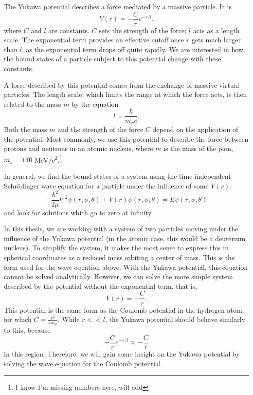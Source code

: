 \documentclass[12pt,twoside]{reedthesis}
\newcommand{\eqn}[1]{\begin{equation}#1\end{equation}}
\begin{document}
The Yukawa potential describes a force mediated by a massive particle. It is %
\eqn{
V(r) = -\frac{C}{r}e^{-r/l}\mbox{,}
}
where $C$ and $l$ are constants. $C$ sets the strength of the force; $l$ acts as a length scale. The exponential term provides an effective cutoff once $r$ gets much larger than $l$, as the exponential term drops off quite rapidly. We are interested in how the bound states of a particle subject to this potential change with these constants. 

A force described by this potential comes from the exchange of massive virtual particles. The length scale, which limits the range at which the force acts, is then related to the mass $m$ by the equation\eqn{
l = \frac{\hbar}{m_{\pi}c}\mbox{.}
}
Both the mass $m$ and the strength of the force $C$ depend on the application of the potential. Most commonly, we use this potential to describe the force between protons and neutrons in an atomic nucleus, where $m$ is the mass of the pion, $m_{\pi} = 140$ MeV/c$^2$.\footnote{I know I'm missing numbers here, will add}

In general, we find the bound states of a system using the time-independent Schr\"odinger wave equation for a particle under the influence of some $V(r)$:
\eqn{
-\frac{\hbar^2}{2\mu}\nabla^2\psi(r,\phi,\theta) + V(r)\psi (r,\phi,\theta) = E \psi(r,\phi,\theta)
\label{eq:TIDSWE-general}
}
and look for solutions which go to zero at infinity.

In this thesis, we are working with a system of two particles moving under the influence of the Yukawa potential (in the atomic case, this would be a deuterium nucleus). To simplify the system, it makes the most sense to express this in spherical coordinates as a reduced mass orbiting a center of mass. This is the form used for the wave equation above. With the Yukawa potential, this equation cannot be solved analytically. However, we can solve the more simple system described by the potential without the exponential term, that is,
\eqn{
 V(r) = -\frac{C}{r}\mbox{.}
 }
This potential is the same form as the Coulomb potential in the hydrogen atom, for which $C = \frac{e^2}{4\pi \epsilon_0}$. While $r << l$, the Yukawa potential should behave similarly to this, because
\begin{equation*}
-\frac{C}{r}e^{-r/l} \approx -\frac{C}{r}
\end{equation*}
in this region. Therefore, we will gain some insight on the Yukawa potential by solving the wave equation for the Coulomb potential.
\end{document}
